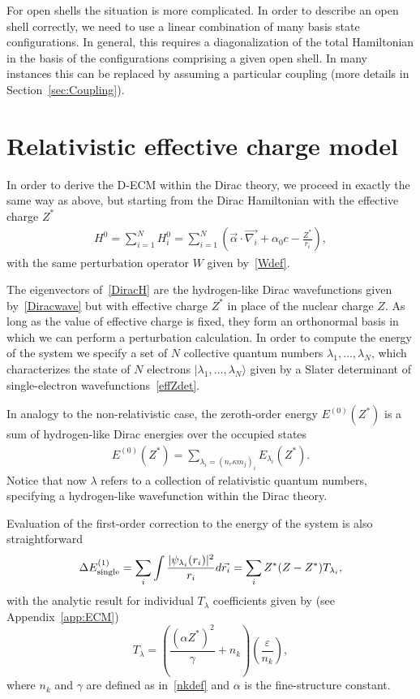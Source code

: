 For open shells the situation is more complicated. In order to describe an open shell correctly, we need to use a linear combination of many basis state configurations. In general, this requires a diagonalization of the total Hamiltonian in the basis of the configurations comprising a given open shell. In many instances this can be replaced by assuming a particular coupling (more details in Section~\ref{sec:Coupling}).

\section{Relativistic effective charge model}

In order to derive the D-ECM within the Dirac theory, we proceed in exactly the same way as above, but starting from the Dirac Hamiltonian with the effective charge $Z^*$
\begin{align} \label{DiracH}
H^0 = \sum_{i = 1}^{N} H^0_i = \sum_{i = 1}^{N}\left(\vec{\alpha} \cdot \vec{\nabla_i} + \alpha_0 c  - \frac{Z^*}{r_i}\right),
\end{align}
with the same perturbation operator $W$ given by~\eqref{Wdef}.

The eigenvectors of~\eqref{DiracH} are the hydrogen-like Dirac wavefunctions given by~\eqref{Diracwave} but with effective charge $Z^*$ in place of the nuclear charge $Z$. As long as the value of effective charge is fixed, they form an orthonormal basis in which we can perform a perturbation calculation. In order to compute the energy of the system we specify a set of $N$ collective
quantum numbers $\lambda_{1}, \ldots, \lambda_{N}$, which
characterizes the state of $N$ electrons
$|\lambda_{1},\ldots,\lambda_{N}\rangle$ given by a Slater determinant of single-electron wavefunctions~\eqref{effZdet}. 

In analogy to the non-relativistic case, the zeroth-order energy $E^{(0)}(Z^{*})$
is a sum of hydrogen-like Dirac energies over the occupied states
\begin{align}
  E^{(0)}(Z^{*}) = \sum_{{\lambda_{i}} = (n_{r}\kappa m_{j})_{i}}
  E_{\lambda_i}(Z^{*}). \label{eq:9} 
\end{align}
Notice that now $\lambda$ refers to a collection of relativistic quantum numbers, specifying a hydrogen-like wavefunction within the Dirac theory.

Evaluation of the first-order correction to the energy of the
system is also straightforward
\begin{equation}
    \Delta E^{(1)}_{\rm{single}} = \sum_i \int \frac{|\psi_{\lambda_i}(r_i)|^2}{r_i} d\vec{r_i} = \sum_i Z^*(Z-Z^*)T_{\lambda_i},
\end{equation}
with the analytic result for individual $T_{\lambda}$ coefficients given by (see Appendix~\ref{app:ECM})
\begin{equation} \label{DiracA}
    T_{\lambda} = \left(\frac{(\alpha Z^*)^2}{\gamma}+n_k\right)\left(\frac{\varepsilon}{n_k}\right),
\end{equation}
where $n_k$ and $\gamma$ are defined as in~\eqref{nkdef} and $\alpha$ is the fine-structure constant.

